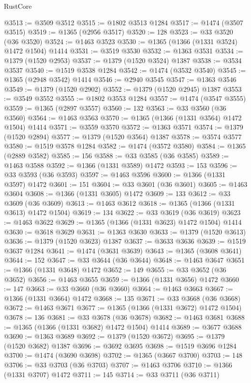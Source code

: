 \begin{lexlean}{RustCore}
\begin{coremodule}
@3513 := @3509 @3512
@3515 := @1802 @3513 @1284
@3517 := @1474 (@3507 @3515)
@3519 := @1365 (@2956 @3517)
@3520 := 128
@3523 := @33 @3520 (@36 @3520)
@3524 := @1463 @3523
@3530 := @1365 (@1366 (@1331 @3524) @1472 @1504) @1414
@3531 := @3519 @3530
@3532 := @1363 @3531
@3534 := @1379 (@1520 @2953)
@3537 := @1379 (@1520 @3524) @1387
@3538 := @3534 @3537
@3540 := @1519 @3538 @1284
@3542 := @1474 (@3532 @3540)
@3545 := @1365 (@2948 @3542) @1414
@3546 := @2940 @3545
@3547 := @1363 @3546
@3549 := @1379 (@1520 @2902)
@3552 := @1379 (@1520 @2945) @1387
@3553 := @3549 @3552
@3555 := @1802 @3553 @1284
@3557 := @1474 (@3547 @3555)
@3559 := @1365 (@2897 @3557)
@3560 := 132
@3563 := @33 @3560 (@36 @3560)
@3564 := @1463 @3563
@3570 := @1365 (@1366 (@1331 @3564) @1472 @1504) @1414
@3571 := @3559 @3570
@3572 := @1363 @3571
@3574 := @1379 (@1520 @2894)
@3577 := @1379 (@1520 @3564) @1387
@3578 := @3574 @3577
@3580 := @1519 @3578 @1284
@3582 := @1474 (@3572 @3580)
@3584 := @1365 (@2889 @3582)
@3585 := 156
@3588 := @33 @3585 (@36 @3585)
@3589 := @1463 @3588
@3592 := @1366 (@1331 @3589) @1472
@3593 := 153
@3596 := @33 @3593 (@36 @3593)
@3597 := @1463 @3596
@3600 := @1366 (@1331 @3597) @1472
@3601 := 151
@3604 := @33 @3601 (@36 @3601)
@3605 := @1463 @3604
@3608 := @1366 (@1331 @3605) @1472
@3609 := 133
@3612 := @33 @3609 (@36 @3609)
@3613 := @1463 @3612
@3618 := @1365 (@1366 (@1331 @3613) @1472 @1504)
@3619 := 134
@3622 := @33 @3619 (@36 @3619)
@3623 := @1463 @3622
@3629 := @1365 (@1366 (@1331 @3623) @1472 @1504) @1414
@3630 := @3618 @3629
@3631 := @1363 @3630
@3633 := @1379 (@1520 @3613)
@3636 := @1379 (@1520 @3623) @1387
@3637 := @3633 @3636
@3639 := @1519 @3637 @1284
@3641 := @1474 (@3631 @3639)
@3643 := @1365 (@3608 @3641)
@3644 := 152
@3647 := @33 @3644 (@36 @3644)
@3648 := @1463 @3647
@3651 := @1366 (@1331 @3648) @1472
@3652 := 149
@3655 := @33 @3652 (@36 @3652)
@3656 := @1463 @3655
@3659 := @1366 (@1331 @3656) @1472
@3660 := 147
@3663 := @33 @3660 (@36 @3660)
@3664 := @1463 @3663
@3667 := @1366 (@1331 @3664) @1472
@3668 := 135
@3671 := @33 @3668 (@36 @3668)
@3672 := @1463 @3671
@3677 := @1365 (@1366 (@1331 @3672) @1472 @1504)
@3678 := 136
@3681 := @33 @3678 (@36 @3678)
@3682 := @1463 @3681
@3688 := @1365 (@1366 (@1331 @3682) @1472 @1504) @1414
@3689 := @3677 @3688
@3690 := @1363 @3689
@3692 := @1379 (@1520 @3672)
@3695 := @1379 (@1520 @3682) @1387
@3696 := @3692 @3695
@3698 := @1519 @3696 @1284
@3700 := @1474 (@3690 @3698)
@3702 := @1365 (@3667 @3700)
@3703 := 148
@3706 := @33 @3703 (@36 @3703)
@3707 := @1463 @3706
@3710 := @1366 (@1331 @3707) @1472
@3711 := 145
@3714 := @33 @3711 (@36 @3711)

\end{coremodule}
\end{lexlean}
